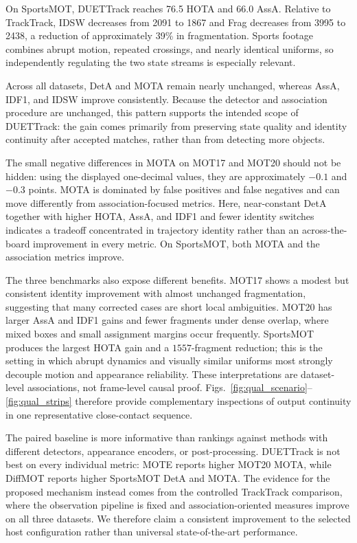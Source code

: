 \documentclass[a4paper,fleqn]{cas-sc}
\begin{document}
On SportsMOT, DUETTrack reaches 76.5 HOTA and 66.0 AssA. Relative to TrackTrack, IDSW decreases from 2091 to 1867 and Frag decreases from 3995 to 2438, a reduction of approximately 39\% in fragmentation. Sports footage combines abrupt motion, repeated crossings, and nearly identical uniforms, so independently regulating the two state streams is especially relevant.

Across all datasets, DetA and MOTA remain nearly unchanged, whereas AssA, IDF1, and IDSW improve consistently. Because the detector and association procedure are unchanged, this pattern supports the intended scope of DUETTrack: the gain comes primarily from preserving state quality and identity continuity after accepted matches, rather than from detecting more objects.

The small negative differences in MOTA on MOT17 and MOT20 should not be hidden: using the displayed one-decimal values, they are approximately $-0.1$ and $-0.3$ points. MOTA is dominated by false positives and false negatives and can move differently from association-focused metrics. Here, near-constant DetA together with higher HOTA, AssA, and IDF1 and fewer identity switches indicates a tradeoff concentrated in trajectory identity rather than an across-the-board improvement in every metric. On SportsMOT, both MOTA and the association metrics improve.

The three benchmarks also expose different benefits. MOT17 shows a modest but consistent identity improvement with almost unchanged fragmentation, suggesting that many corrected cases are short local ambiguities. MOT20 has larger AssA and IDF1 gains and fewer fragments under dense overlap, where mixed boxes and small assignment margins occur frequently. SportsMOT produces the largest HOTA gain and a $1557$-fragment reduction; this is the setting in which abrupt dynamics and visually similar uniforms most strongly decouple motion and appearance reliability. These interpretations are dataset-level associations, not frame-level causal proof. Figs.~\ref{fig:qual_scenario}--\ref{fig:qual_strips} therefore provide complementary inspections of output continuity in one representative close-contact sequence.

The paired baseline is more informative than rankings against methods with different detectors, appearance encoders, or post-processing. DUETTrack is not best on every individual metric: MOTE reports higher MOT20 MOTA, while DiffMOT reports higher SportsMOT DetA and MOTA. The evidence for the proposed mechanism instead comes from the controlled TrackTrack comparison, where the observation pipeline is fixed and association-oriented measures improve on all three datasets. We therefore claim a consistent improvement to the selected host configuration rather than universal state-of-the-art performance.
\end{document}
